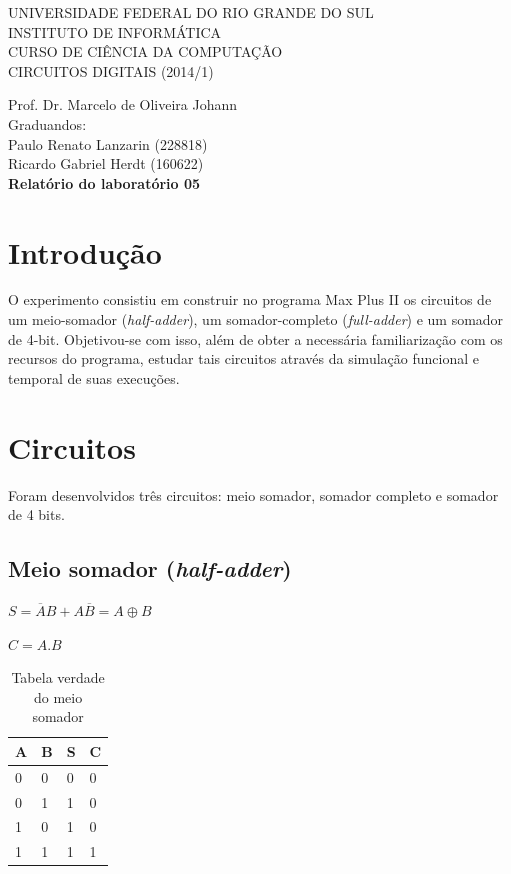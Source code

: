 \documentclass[a4paper]{article}
\begin{document}
\begin{center}


\large{ 
\uppercase{ Universidade Federal do Rio Grande do Sul\\

Instituto de Informática \\

Curso de Ciência da Computação \\

Circuitos Digitais (2014/1)\\
}

Prof. Dr. Marcelo de Oliveira Johann \\

Graduandos: \\ Paulo Renato Lanzarin (228818)
			\\ Ricardo Gabriel Herdt (160622) \\[1cm]

\bfseries Relatório do laboratório 05\\[1.0cm]
}

\end{center}
\section{Introdução}

	O experimento consistiu em construir no programa Max Plus II os
circuitos de um meio-somador (\emph{half-adder}), um somador-completo
(\emph{full-adder}) e um somador de 4-bit.  Objetivou-se com isso, além de
obter a necessária familiarização com os recursos do programa, estudar tais
circuitos através da simulação funcional e temporal de suas execuções.


\section{Circuitos}

Foram desenvolvidos três circuitos: meio somador, somador completo e somador de
4 bits.

\subsection{Meio somador (\emph{half-adder})}

$S = \overline{A}B + A\overline{B} = A \oplus B $

$C = A . B$

\begin{table}[h]
\centering
\begin{tabular}{| l | l | l | l |}
	\hline
	A	&B	&S	&C	\\
	\hline
	0	&0	&0	&0	\\
	0	&1	&1	&0	\\
	1	&0	&1	&0	\\
	1	&1	&1	&1	\\
	\hline
\end{tabular}
\caption{Tabela verdade do meio somador}
\end{table}
\end{document}
